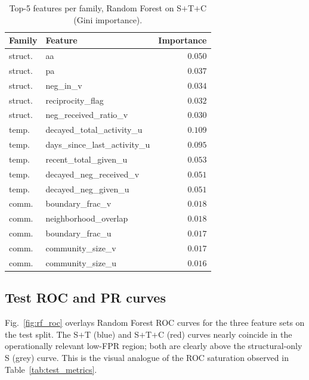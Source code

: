 \documentclass[conference]{IEEEtran}
\begin{document}
\begin{table}[t]
\caption{Top-5 features per family, Random Forest on S$+$T$+$C
(Gini importance).}
\label{tab:imp_rf_topfam}
\centering
\small
\begin{tabular}{llr}
\toprule
Family & Feature & Importance \\
\midrule
struct.\ & aa                          & $0.050$ \\
struct.\ & pa                          & $0.037$ \\
struct.\ & neg\_in\_v                  & $0.034$ \\
struct.\ & reciprocity\_flag           & $0.032$ \\
struct.\ & neg\_received\_ratio\_v     & $0.030$ \\
\addlinespace
temp.\   & decayed\_total\_activity\_u & $0.109$ \\
temp.\   & days\_since\_last\_activity\_u & $0.095$ \\
temp.\   & recent\_total\_given\_u     & $0.053$ \\
temp.\   & decayed\_neg\_received\_v   & $0.051$ \\
temp.\   & decayed\_neg\_given\_u      & $0.051$ \\
\addlinespace
comm.\   & boundary\_frac\_v           & $0.018$ \\
comm.\   & neighborhood\_overlap       & $0.018$ \\
comm.\   & boundary\_frac\_u           & $0.017$ \\
comm.\   & community\_size\_v          & $0.017$ \\
comm.\   & community\_size\_u          & $0.016$ \\
\bottomrule
\end{tabular}
\end{table}

\subsection{Test ROC and PR curves}\label{sec:results:curves}

Fig.~\ref{fig:rf_roc} overlays Random Forest ROC curves for the three
feature sets on the test split. The S$+$T (blue) and S$+$T$+$C (red)
curves nearly coincide in the operationally relevant low-FPR region;
both are clearly above the structural-only S (grey) curve. This is the
visual analogue of the ROC saturation observed in
Table~\ref{tab:test_metrics}.
\end{document}

